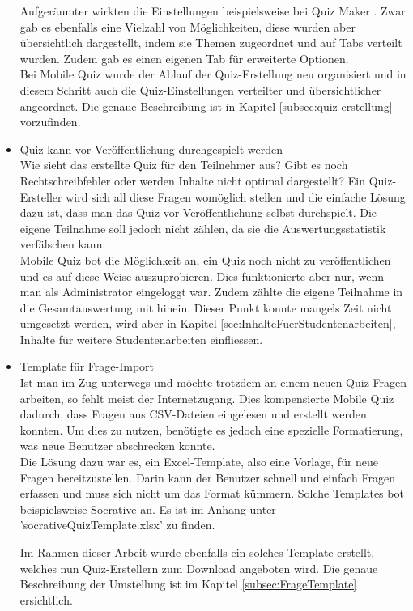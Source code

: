 \begin{itemize}
		Aufgeräumter wirkten die Einstellungen beispielsweise bei Quiz Maker \cite{quiz-maker}. Zwar gab es ebenfalls eine Vielzahl von Möglichkeiten, diese wurden aber übersichtlich dargestellt, indem sie Themen zugeordnet und auf Tabs verteilt wurden. Zudem gab es einen eigenen Tab für erweiterte Optionen. \\
		Bei Mobile Quiz wurde der Ablauf der Quiz-Erstellung neu organisiert und in diesem Schritt auch die Quiz-Einstellungen verteilter und übersichtlicher angeordnet. Die genaue Beschreibung ist in Kapitel \ref{subsec:quiz-erstellung} vorzufinden.
		
		
		
		\item Quiz kann vor Veröffentlichung durchgespielt werden \\
		Wie sieht das erstellte Quiz für den Teilnehmer aus? Gibt es noch Rechtschreibfehler oder werden Inhalte nicht optimal dargestellt? Ein Quiz-Ersteller wird sich all diese Fragen womöglich stellen und die einfache Lösung dazu ist, dass man das Quiz vor Veröffentlichung selbst durchspielt. Die eigene Teilnahme soll jedoch nicht zählen, da sie die Auswertungsstatistik verfälschen kann. \\
		Mobile Quiz bot die Möglichkeit an, ein Quiz noch nicht zu veröffentlichen und es auf diese Weise auszuprobieren. Dies funktionierte aber nur, wenn man als Administrator eingeloggt war. Zudem zählte die eigene Teilnahme in die Gesamtauswertung mit hinein.
		Dieser Punkt konnte mangels Zeit nicht umgesetzt werden, wird aber in Kapitel \ref{sec:InhalteFuerStudentenarbeiten}, Inhalte für weitere Studentenarbeiten einfliessen.
		
		
		\item Template für Frage-Import \\
		Ist man im Zug unterwegs und möchte trotzdem an einem neuen Quiz-Fragen arbeiten, so fehlt meist der Internetzugang. Dies kompensierte Mobile Quiz dadurch, dass Fragen aus \gls{CSV}-Dateien eingelesen und erstellt werden konnten. Um dies zu nutzen, benötigte es jedoch eine spezielle Formatierung, was neue Benutzer abschrecken konnte. \\
		Die Lösung dazu war es, ein Excel-Template, also eine Vorlage, für neue Fragen bereitzustellen. Darin kann der Benutzer schnell und einfach Fragen erfassen und muss sich nicht um das Format kümmern. Solche Templates bot beispielsweise
		Socrative \cite{socrative.com} an. Es ist im Anhang unter 'socrativeQuizTemplate.xlsx' zu finden.
		
		Im Rahmen dieser Arbeit wurde ebenfalls ein solches Template erstellt, welches nun Quiz-Erstellern zum Download angeboten wird. Die genaue Beschreibung der Umstellung ist im Kapitel \ref{subsec:FrageTemplate} ersichtlich.
		
	\end{itemize}